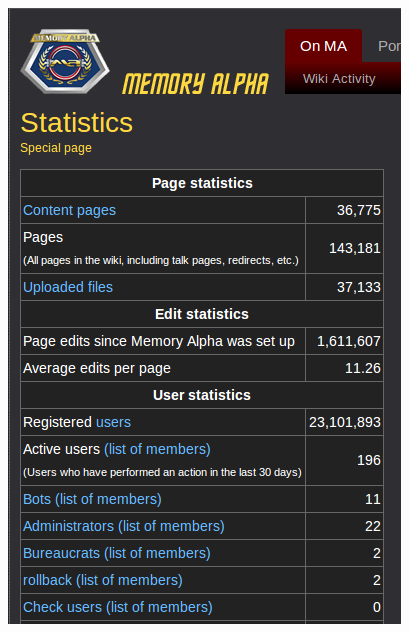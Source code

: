 \documentclass{beamer}
\begin{document}
\begin{frame}
\begin{columns}
\begin{column}{0.5\textwidth}
      \includegraphics[height = 0.8\textheight, width = \textwidth, keepaspectratio = true]{figure/trek_stats}
    \end{column}
  \end{columns}
\end{frame}
\end{document}
